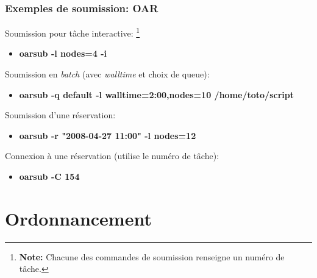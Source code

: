 \documentclass{beamer}
\begin{document}

\begin{frame}
	\frametitle{Exemples de soumission: OAR}
	
Soumission pour tâche interactive: \footnote{{\bf Note:} Chacune des commandes de soumission renseigne un numéro de tâche.}

		\begin{itemize}
			\item	{\bf oarsub -l nodes=4 -i}
		\end{itemize}

	Soumission en {\em batch} (avec {\em walltime} et choix de queue):
		\begin{itemize}
			\item	{\bf oarsub -q default -l walltime=2:00,nodes=10 /home/toto/script}
		\end{itemize}

	Soumission d'une réservation:
		\begin{itemize}
			\item	{\bf oarsub -r "2008-04-27 11:00" -l nodes=12}
		\end{itemize}

	Connexion à une réservation (utilise le numéro de tâche):
		\begin{itemize}
			\item	{\bf oarsub -C 154}
		\end{itemize}


\end{frame}

\section{Ordonnancement}
\end{document}
